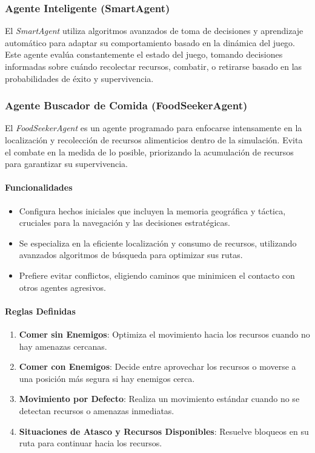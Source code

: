 \documentclass[11pt]{article}
\begin{document}
\subsubsection{Agente Inteligente (SmartAgent)}
El \textit{SmartAgent} utiliza algoritmos avanzados de toma de decisiones y aprendizaje automático para adaptar su comportamiento basado en la dinámica del juego. Este agente evalúa constantemente el estado del juego, tomando decisiones informadas sobre cuándo recolectar recursos, combatir, o retirarse basado en las probabilidades de éxito y supervivencia.

\subsubsection{Agente Buscador de Comida (FoodSeekerAgent)}
El \textit{FoodSeekerAgent} es un agente programado para enfocarse intensamente en la localización y recolección de recursos alimenticios dentro de la simulación. Evita el combate en la medida de lo posible, priorizando la acumulación de recursos para garantizar su supervivencia.

\paragraph{Funcionalidades}
\begin{itemize}
    \item Configura hechos iniciales que incluyen la memoria geográfica y táctica, cruciales para la navegación y las decisiones estratégicas.
    \item Se especializa en la eficiente localización y consumo de recursos, utilizando avanzados algoritmos de búsqueda para optimizar sus rutas.
    \item Prefiere evitar conflictos, eligiendo caminos que minimicen el contacto con otros agentes agresivos.
\end{itemize}

\paragraph{Reglas Definidas}
\begin{enumerate}
    \item \textbf{Comer sin Enemigos}: Optimiza el movimiento hacia los recursos cuando no hay amenazas cercanas.
    \item \textbf{Comer con Enemigos}: Decide entre aprovechar los recursos o moverse a una posición más segura si hay enemigos cerca.
    \item \textbf{Movimiento por Defecto}: Realiza un movimiento estándar cuando no se detectan recursos o amenazas inmediatas.
    \item \textbf{Situaciones de Atasco y Recursos Disponibles}: Resuelve bloqueos en su ruta para continuar hacia los recursos.
\end{enumerate}
\end{document}
